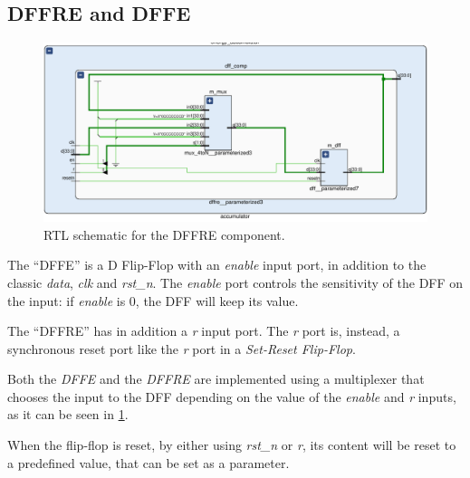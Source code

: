 \subsection{DFFRE and DFFE}
\begin{figure}[]
  \centering
  \includegraphics[width=\textwidth]{figs/dffre_schematic.pdf}
  \caption{RTL schematic for the DFFRE component.}
  \label{fig:dffre}
\end{figure}

The ``DFFE'' is a D Flip-Flop with an \emph{enable} input port, 
in addition to the classic \emph{data}, \emph{clk} and \emph{rst\_n}.
The \emph{enable} port controls the sensitivity of the DFF on the input: if 
\emph{enable} is 0, the DFF will keep its value. 

The ``DFFRE'' has in addition a \emph{r} input port. The \emph{r} port is, instead,
a synchronous reset port like the \emph{r} port in a \emph{Set-Reset Flip-Flop}.

Both the \emph{DFFE} and the \emph{DFFRE} are implemented using a multiplexer that 
chooses the input to the DFF depending on the value of the \emph{enable} and 
\emph{r} inputs, as it can be seen in \cref{fig:dffre}.

When the flip-flop is reset, by either using \emph{rst\_n} or \emph{r}, its 
content will be reset to a predefined value, that can be set as a parameter.